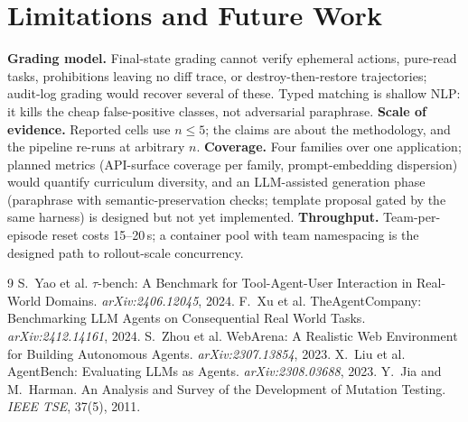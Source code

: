 \documentclass[10pt]{article}
\begin{document}
\section{Limitations and Future Work}

\textbf{Grading model.} Final-state grading cannot verify ephemeral actions, pure-read tasks, prohibitions leaving no diff trace, or destroy-then-restore trajectories; audit-log grading would recover several of these. Typed matching is shallow NLP: it kills the cheap false-positive classes, not adversarial paraphrase. \textbf{Scale of evidence.} Reported cells use $n \le 5$; the claims are about the methodology, and the pipeline re-runs at arbitrary $n$. \textbf{Coverage.} Four families over one application; planned metrics (API-surface coverage per family, prompt-embedding dispersion) would quantify curriculum diversity, and an LLM-assisted generation phase (paraphrase with semantic-preservation checks; template proposal gated by the same harness) is designed but not yet implemented. \textbf{Throughput.} Team-per-episode reset costs 15--20\,s; a container pool with team namespacing is the designed path to rollout-scale concurrency.

\begin{thebibliography}{9}\small
{} S.~Yao et al. $\tau$-bench: A Benchmark for Tool-Agent-User Interaction in Real-World Domains. \emph{arXiv:2406.12045}, 2024.
 F.~Xu et al. TheAgentCompany: Benchmarking LLM Agents on Consequential Real World Tasks. \emph{arXiv:2412.14161}, 2024.
 S.~Zhou et al. WebArena: A Realistic Web Environment for Building Autonomous Agents. \emph{arXiv:2307.13854}, 2023.
 X.~Liu et al. AgentBench: Evaluating LLMs as Agents. \emph{arXiv:2308.03688}, 2023.
 Y.~Jia and M.~Harman. An Analysis and Survey of the Development of Mutation Testing. \emph{IEEE TSE}, 37(5), 2011.
\end{thebibliography}
\end{document}
